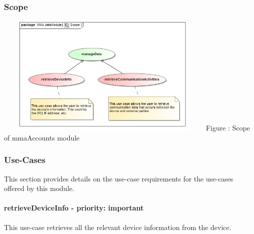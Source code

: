 \documentclass[hidelinks, 12pt, oneside]{article}
\begin{document}
	\subsubsection{Scope}
		\includegraphics[width=400px,height=220px]{img/scopeData.jpg}
		Figure : Scope of mmaAccounts module	
	
	\subsubsection{Use-Cases}
		This section provides details on the use-case requirements for the use-cases offered by this module.	
		
	\paragraph{retrieveDeviceInfo - priority: important}
		This use-case retrieves all the relevant device information from the device.\newline
\end{document}
